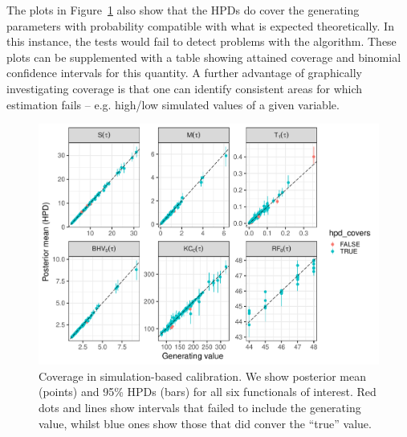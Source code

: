 \documentclass[oneside]{article}
\begin{document}
The plots in Figure~\ref{fig:phylo_calibration} also show that the HPDs do cover the generating parameters with probability compatible with what is expected theoretically.
In this instance, the tests would fail to detect problems with the algorithm.
These plots can be supplemented with a table showing attained coverage and binomial confidence intervals for this quantity.
A further advantage of graphically investigating coverage is that one can identify consistent areas for which estimation fails -- e.g. high/low simulated values of a given variable.

\begin{figure}
 \includegraphics[width=\textwidth]{../figures/coverage.pdf}
    \caption{Coverage in simulation-based calibration.
    We show posterior mean (points) and 95\% HPDs (bars) for all six functionals of interest.
    Red dots and lines show intervals that failed to include the generating value, whilst blue ones show those that did conver the ``true'' value.}
  \label{fig:phylo_calibration}
\end{figure}

  
\end{document}
